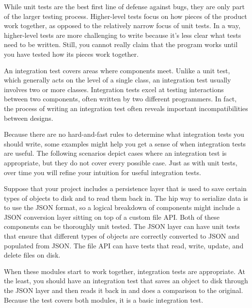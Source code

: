 
While unit tests are the best first line of defense against bugs, they are only part of the larger testing process. Higher-level tests focus on how pieces of the product work together, as opposed to the relatively narrow focus of unit tests. In a way, higher-level tests are more challenging to write because it’s less clear what tests need to be written. Still, you cannot really claim that the program works until you have tested how its pieces work together.


An integration test covers areas where components meet. Unlike a unit test, which generally acts on the level of a single class, an integration test usually involves two or more classes. Integration tests excel at testing interactions between two components, often written by two different programmers. In fact, the process of writing an integration test often reveals important incompatibilities between designs.


Because there are no hard-and-fast rules to determine what integration tests you should write, some examples might help you get a sense of when integration tests are useful. The following scenarios depict cases where an integration test is appropriate, but they do not cover every possible case. Just as with unit tests, over time you will refine your intuition for useful integration tests.


Suppose that your project includes a persistence layer that is used to save certain types of objects to disk and to read them back in. The hip way to serialize data is to use the JSON format, so a logical breakdown of components might include a JSON conversion layer sitting on top of a custom file API. Both of these components can be thoroughly unit tested. The JSON layer can have unit tests that ensure that different types of objects are correctly converted to JSON and populated from JSON. The file API can have tests that read, write, update, and delete files on disk.

When these modules start to work together, integration tests are appropriate. At the least, you should have an integration test that saves an object to disk through the JSON layer and then reads it back in and does a comparison to the original. Because the test covers both modules, it is a basic integration test.

